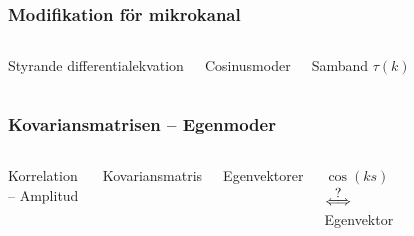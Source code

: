 \documentclass[swedish]{beamer}
\newcommand\impl{\stackrel{\mathclap{\normalfont\mbox{?}}}{\Longleftrightarrow}}
\begin{document}
\begin{frame}
\frametitle{Modifikation för mikrokanal}
 \begin{columns}[c]

Styrande differentialekvation
\vspace{8mm}

Cosinusmoder
\vspace{8mm}

Samband $\tau(k)$



\begin{figure}
\resizebox{!}{!}{}
\end{figure}


\end{columns}

\end{frame}


\begin{frame}
\frametitle{Kovariansmatrisen -- Egenmoder}


\begin{columns}[c]


Korrelation -- Amplitud
\vspace{8mm}

Kovariansmatris
\vspace{8mm}

Egenvektorer
\vspace{8mm}

$\cos (ks)$ $\impl$ Egenvektor

\begin{figure}

\end{figure}

\end{columns}
    
\end{frame}
\end{document}
